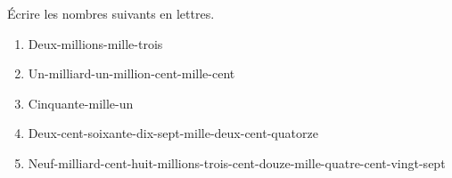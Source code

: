 \documentclass[exercice]{thedocument}%
\begin{document}
%
Écrire les nombres suivants en lettres.
\begin{enumerate}
    \item Deux-millions-mille-trois
    \item Un-milliard-un-million-cent-mille-cent
    \item Cinquante-mille-un
    \item Deux-cent-soixante-dix-sept-mille-deux-cent-quatorze
    \item Neuf-milliard-cent-huit-millions-trois-cent-douze-mille-quatre-cent-vingt-sept
\end{enumerate}
\end{document}
